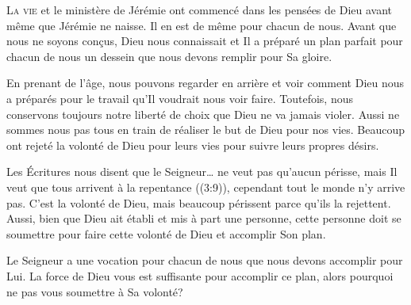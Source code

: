 



\lettrine{L}{a vie} et le ministère de Jérémie ont commencé
 dans les pensées de Dieu avant même que Jérémie ne naisse.
 Il en est de même pour chacun de nous. Avant que nous ne soyons con\c{c}us,
 Dieu nous connaissait et Il a préparé un plan parfait pour chacun de nous
 \ocadr un dessein que nous devons remplir pour Sa gloire. 

En prenant de l'âge, nous pouvons regarder en arrière et voir
 comment Dieu nous a préparés pour le travail qu'Il voudrait nous voir faire.
 Toutefois, nous conservons toujours notre liberté de choix que Dieu
 ne va jamais violer. Aussi ne sommes nous pas tous en train de réaliser
 le but de Dieu pour nos vies. Beaucoup ont rejeté la volonté de Dieu
 pour leurs vies pour suivre leurs propres désirs. 


Les Écritures nous disent que \Og le 
 Seigneur\dots{} ne veut pas qu'aucun périsse, mais Il veut que tous arrivent
 à la repentance \Fg{} ((3:9)), cependant tout le monde
 n'y arrive pas. C'est la volonté de Dieu, mais beaucoup périssent
 parce qu'ils la rejettent. Aussi, bien que Dieu ait établi et mis à part
 une personne, cette personne doit se soumettre pour faire cette volonté
 de Dieu et accomplir Son plan. 

Le Seigneur a une vocation pour chacun de nous que nous devons accomplir
 pour Lui. La force de Dieu vous est suffisante pour accomplir ce plan,
 alors pourquoi ne pas vous soumettre à Sa volonté? 

\dvrule



